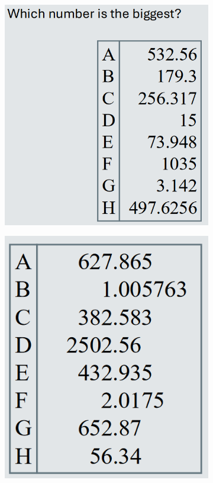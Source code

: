 \documentclass[]{project_plan}
\begin{document}
\begin{figure}
  \centering
  \begin{subfigure}{.5\textwidth}
    \centering
    \includegraphics[width=.7\linewidth]{graphic_design_bad_integers.png}
  \end{subfigure}%
  \begin{subfigure}{.5\textwidth}
    \centering
    \includegraphics[width=.7\linewidth]{graphic_design_good_integers.png}
  \end{subfigure}
\end{figure}

\newpage
\end{document}
